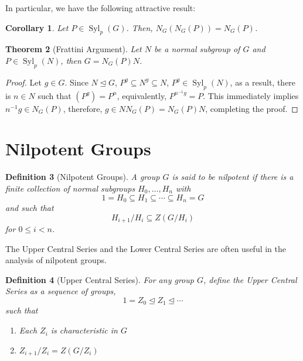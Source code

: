 \documentclass[12pt]{article}
\theoremstyle{thmstyle}
\newtheorem{theorem}{Theorem}[section]
\theoremstyle{defstyle}
\newtheorem{definition}[theorem]{Definition}
\newtheorem{corollary}[theorem]{Corollary}
\renewcommand{\le}{\leqslant}
\newcommand{\Syl}{\operatorname{Syl}}
\begin{document}
In particular, we have the following attractive result:
\begin{corollary}
    Let $P\in\Syl_p(G)$. Then, $N_G(N_G(P)) = N_G(P)$.
\end{corollary}

\begin{theorem}[Frattini Argument]
    Let $N$ be a normal subgroup of $G$ and $P\in\Syl_p(N)$, then $G = N_G(P)N$.
\end{theorem}
\begin{proof}
    Let $g\in G$. Since $N\unlhd G$, $P^g\subseteq N^g\subseteq N$, $P^g\in\Syl_p(N)$, as a result, there is $n\in N$ such that $(P^g) = P^n$, equivalently, $P^{n^{-1}g} = P$. This immediately implies $n^{-1}g\in N_G(P)$, therefore, $g\in NN_G(P) = N_G(P)N$, completing the proof.
\end{proof}

\section{Nilpotent Groups}

\begin{definition}[Nilpotent Groups]
    A group $G$ is said to be \textit{nilpotent} if there is a finite collection of normal subgroups $H_0,\ldots,H_n$ with 
    \begin{equation*}
        1 = H_0\subseteq H_1\subseteq\cdots\subseteq H_n = G
    \end{equation*}
    and such that 
    \begin{equation*}
        H_{i + 1}/H_i\subseteq Z(G/H_{i})
    \end{equation*}
    for $0\le i < n$.
\end{definition}

The Upper Central Series and the Lower Central Series are often useful in the analysis of nilpotent groups.

\begin{definition}[Upper Central Series]
    For any group $G$, define the \textit{Upper Central Series} as a sequence of groups,
    \begin{equation*}
        1 = Z_0\unlhd Z_1\unlhd\cdots
    \end{equation*}
    such that 
    \begin{enumerate}
        \item Each $Z_i$ is characteristic in $G$ 
        \item $Z_{i + 1}/Z_i = Z(G/Z_i)$
    \end{enumerate}
\end{definition}
\end{document}
